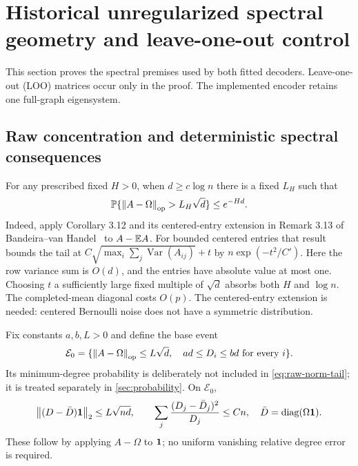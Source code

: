 \section{Historical unregularized spectral geometry and leave-one-out control}
\label{sec:geometry}

This section proves the spectral premises used by both fitted decoders.
Leave-one-out (LOO) matrices occur only in the proof. The implemented
encoder retains one full-graph eigensystem.

\subsection{Raw concentration and deterministic spectral consequences}

For any prescribed fixed $H>0$, when $d\ge c\log n$ there is a fixed
$L_H$ such that
\begin{equation}\label{eq:raw-norm-tail}
 \mathbb P\{\left\lVert A-\Omega\right\rVert_{\mathrm{op}}>L_H\sqrt d\}\le e^{-Hd}.
\end{equation}
Indeed, apply Corollary 3.12 and its centered-entry extension in
Remark 3.13 of Bandeira--van Handel~\cite{bvh} to $A-\mathbb E A$.
For bounded centered entries that result bounds the tail at
$C\sqrt{\max_i\sum_j\operatorname{Var}(A_{ij})}+t$ by
$n\exp(-t^2/C')$. Here the row variance sum is $O(d)$, and the entries
have absolute value at most one. Choosing $t$ a sufficiently large fixed
multiple of $\sqrt d$ absorbs both $H$ and $\log n$.
The completed-mean diagonal costs $O(p)$. The centered-entry extension is
needed: centered Bernoulli noise does not have a symmetric distribution.

Fix constants $a,b,L>0$ and define the base event
\begin{equation}\label{eq:base-event}
 \mathcal E_0=
 \{\left\lVert A-\Omega\right\rVert_{\mathrm{op}}\le L\sqrt d,
       \quad ad\le D_i\le bd\text{ for every }i\}.
\end{equation}
Its minimum-degree probability is deliberately not included in
\eqref{eq:raw-norm-tail}; it is treated separately in
\cref{sec:probability}.
On $\mathcal E_0$,
\begin{equation}\label{eq:degree-aggregate}
 \left\lVert(D-\bar D)\mathbf 1\right\rVert_2\le L\sqrt{nd},\qquad
 \sum_j\frac{(D_j-\bar D_j)^2}{D_j}\le Cn,
 \quad \bar D=\operatorname{diag}(\Omega\mathbf 1).
\end{equation}
These follow by applying $A-\Omega$ to $\mathbf 1$; no uniform vanishing
relative degree error is required.


